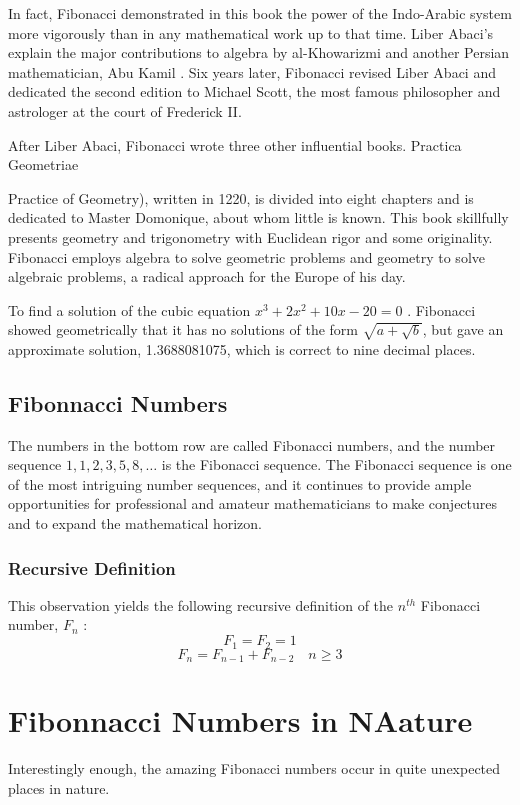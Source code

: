 \documentclass[10pt]{report}
\begin{document}
	In fact, Fibonacci demonstrated in this book the power of the Indo-Arabic system more vigorously than in any mathematical work up to that time. Liber Abaci's  explain the
major contributions to algebra by al-Khowarizmi and another Persian mathematician, Abu Kamil . Six years later, Fibonacci revised Liber Abaci and dedicated the second edition to Michael Scott, the most famous philosopher and astrologer at the court of Frederick II.

After Liber Abaci, Fibonacci wrote three other influential books. Practica Geometriae {Practice of Geometry), written in 1220, is divided into eight chapters  and is dedicated to Master Domonique, about whom little is known. This book skillfully presents geometry and trigonometry with Euclidean rigor and some originality. Fibonacci employs algebra to solve geometric problems and geometry to solve algebraic problems, a radical approach for the Europe of his day.

To find a solution of the cubic equation $x^3 + 2x^2 +10x- 20 = 0$  . Fibonacci showed geometrically that it has no solutions of the form $\sqrt{a+\sqrt{b}}$, but gave an approximate solution, 1.3688081075, which is correct to nine decimal places. 




\section{Fibonnacci Numbers}
The numbers in the bottom row are called Fibonacci numbers, and the number sequence $1, 1, 2, 3, 5, 8, \ldots$ is the Fibonacci sequence.  The Fibonacci sequence is one of the most intriguing number sequences, and it
continues to provide ample opportunities for professional and amateur mathematicians to make conjectures and to expand the mathematical horizon.

\subsection{Recursive Definition}
This observation yields the following recursive definition of the $n^{th}$  Fibonacci number, $F_n $ :
 \[F_1=F_2=1\]
 \[
 F_n=F_{n-1}+F_{n-2} \quad n\geq 3
 \]

\chapter{Fibonnacci Numbers in  NAature}
Interestingly enough, the amazing Fibonacci numbers occur in quite unexpected places in nature.

}
\end{document}
